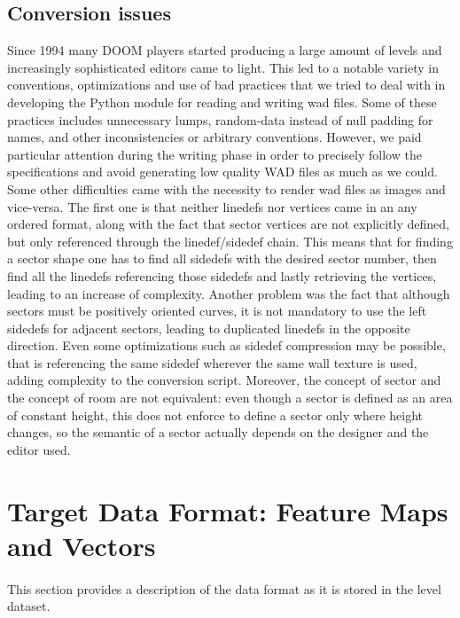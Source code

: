 \subsection{Conversion issues} 
Since 1994 many DOOM players started producing a large amount of levels and increasingly sophisticated editors came to light. This led to a notable variety in conventions, optimizations and use of bad practices that we tried to deal with in developing the Python module for reading and writing wad files. Some of these practices includes unnecessary lumps, random-data instead of null padding for names, and other inconsistencies or arbitrary conventions. 
However, we paid particular attention during the writing phase in order to precisely follow the specifications and avoid generating low quality WAD files as much as we could.
Some other difficulties came with the necessity to render wad files as images and vice-versa. The first one is that neither \glspl{linedef} nor vertices came in an any ordered format, along with the fact that sector vertices are not explicitly defined, but only referenced through the linedef/sidedef chain. This means that for finding a sector shape one has to find all sidedefs with the desired sector number, then find all the linedefs referencing those sidedefs and lastly retrieving the vertices, leading to an increase of complexity. Another problem was the fact that although sectors must be positively oriented curves, it is not mandatory to use the left sidedefs for adjacent sectors, leading to duplicated linedefs in the opposite direction. Even some optimizations such as sidedef compression may be possible, that is referencing the same sidedef wherever the same wall texture is used, adding complexity to the conversion script. Moreover, the concept of sector and the concept of room are not equivalent: even though a sector is defined as an area of constant height, this does not enforce to define a sector only where height changes, so the semantic of a sector actually depends on the designer and the editor used. 


\section{Target Data Format: Feature Maps and Vectors}
\label{sec:TargetFormat}
\paragraph{} This section provides a description of the data format as it is stored in the level dataset.
